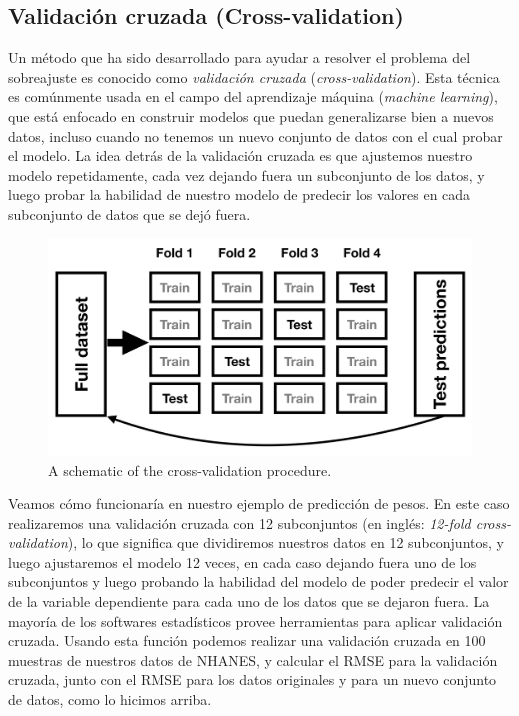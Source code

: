 \documentclass[
  12pt,
]{book}
\begin{document}
\hypertarget{cross-validation}{%
\subsection{Validación cruzada (Cross-validation)}\label{cross-validation}}

Un método que ha sido desarrollado para ayudar a resolver el problema del sobreajuste es conocido como \emph{validación cruzada} (\emph{cross-validation}). Esta técnica es comúnmente usada en el campo del aprendizaje máquina (\emph{machine learning}), que está enfocado en construir modelos que puedan generalizarse bien a nuevos datos, incluso cuando no tenemos un nuevo conjunto de datos con el cual probar el modelo. La idea detrás de la validación cruzada es que ajustemos nuestro modelo repetidamente, cada vez dejando fuera un subconjunto de los datos, y luego probar la habilidad de nuestro modelo de predecir los valores en cada subconjunto de datos que se dejó fuera.

\begin{figure}
\includegraphics[width=45.74in,height=0.3\textheight]{images/crossvalidation} \caption{A schematic of the  cross-validation procedure.}\label{fig:crossvalidation}
\end{figure}

Veamos cómo funcionaría en nuestro ejemplo de predicción de pesos. En este caso realizaremos una validación cruzada con 12 subconjuntos (en inglés: \emph{12-fold cross-validation}), lo que significa que dividiremos nuestros datos en 12 subconjuntos, y luego ajustaremos el modelo 12 veces, en cada caso dejando fuera uno de los subconjuntos y luego probando la habilidad del modelo de poder predecir el valor de la variable dependiente para cada uno de los datos que se dejaron fuera. La mayoría de los softwares estadísticos provee herramientas para aplicar validación cruzada. Usando esta función podemos realizar una validación cruzada en 100 muestras de nuestros datos de NHANES, y calcular el RMSE para la validación cruzada, junto con el RMSE para los datos originales y para un nuevo conjunto de datos, como lo hicimos arriba.
\end{document}
